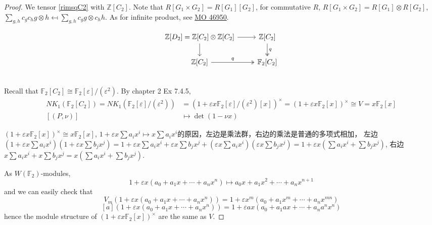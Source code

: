 \begin{proof}
	We tensor \ref{rimsqC2} with $\mathbb{Z}[C_2]$. Note that $R[G_1\times G_2]=R[G_1][G_2]$, for commutative $R$, $R[G_1\times G_2]=R[G_1]\otimes R[G_2]$, $\sum_{g,h}c_gc_h g\otimes h \mapsfrom \sum_{g,h}c_g g\otimes c_h h$. As for infinite product, see \href{http://mathoverflow.net/questions/46950/group-rings-of-infinite-products-of-groups}{MO 46950}.

	\begin{equation}
\label{rimsqD2}
	\begin{tikzcd}
		\mathbb{Z}[D_2]=\mathbb{Z}[C_2] \otimes \mathbb{Z}[C_2] \ar[r] \ar[d]& \mathbb{Z}[C_2]\ar[two heads, d,"q"]\\
		 \mathbb{Z}[C_2]\ar[two heads, r,"q"] & \mathbb{F}_2[C_2]\\
	\end{tikzcd}
\end{equation}
	Recall that $\mathbb{F}_2[C_2]\cong \mathbb{F}_2[\varepsilon]/(\varepsilon^2)$. By \cite{weibel2013k} chapter 2 Ex 7.4.5,
	\begin{align*}
	NK_1(\mathbb{F}_2[C_2])=NK_1(\mathbb{F}_2[\varepsilon]/(\varepsilon^2)) & = (1+\varepsilon x\mathbb{F}_2[\varepsilon]/(\varepsilon^2)[x])^{\times} =(1+\varepsilon x\mathbb{F}_2[x])^{\times} \cong V =x \mathbb{F}_2[x]\\
	[(P,\nu)] &\mapsto \det(1-\nu x)
	\end{align*}

\begin{remark}
	$(1+\varepsilon x\mathbb{F}_2[x])^{\times} \cong x \mathbb{F}_2[x]$, $1+\varepsilon x \sum a_i x^i \mapsto x \sum a_i x^i$的原因，左边是乘法群，右边的乘法是普通的多项式相加，
	左边$(1+\varepsilon x \sum a_i x^i)(1+\varepsilon x \sum b_j x^j)=1+\varepsilon x \sum a_i x^i+\varepsilon x \sum b_j x^j + (\varepsilon x \sum a_i x^i)(\varepsilon x \sum b_j x^j)= 1+\varepsilon x (\sum a_i x^i+\sum b_j x^j)$, 右边$x \sum a_i x^i + x \sum b_j x^j = x (\sum a_i x^i+\sum b_j x^j)$.

\end{remark}

	As $W(\mathbb{F}_2)$-modules, 
	\[1+\varepsilon x (a_0+a_1 x+\cdots+a_n x^n)\mapsto a_0 x +a_1 x^2+\cdots +a_n x^{n+1}\]
	and we can easily check that
	\[V_m(1+\varepsilon x (a_0+a_1 x+\cdots+a_n x^n))=1+\varepsilon x^m (a_0+a_1 x^m+\cdots+a_n x^{mn})\]
	\[ [a](1+\varepsilon x (a_0+a_1 x+\cdots+a_n x^n))=1+\varepsilon ax (a_0+a_1 ax+\cdots+a_n a^nx^n)\]
    hence the module structure of $(1+\varepsilon x\mathbb{F}_2[x])^{\times}$ are the same as $V$.


\end{proof}
